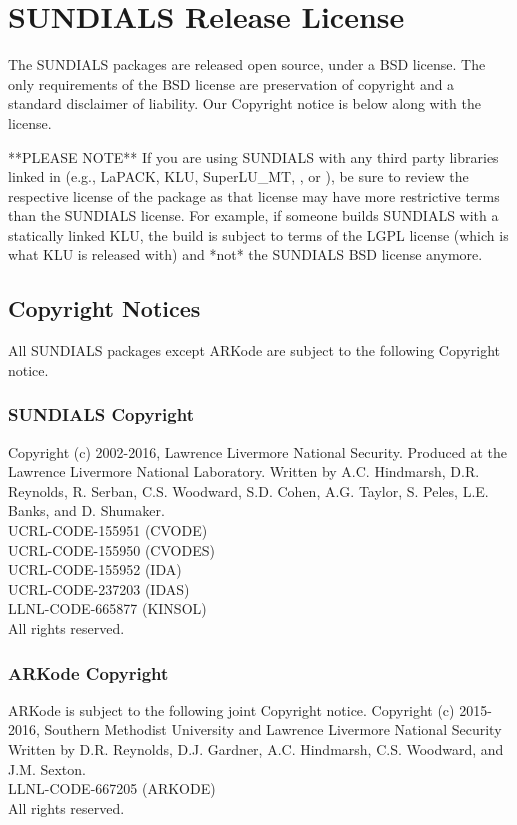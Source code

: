 \section{SUNDIALS Release License}

The SUNDIALS packages are released open source, under a BSD license.
The only requirements of the BSD license are preservation of copyright and a standard disclaimer of liability.
Our Copyright notice is below along with the license.

{\warn}**PLEASE NOTE**  If you are using SUNDIALS with any third 
party libraries linked in (e.g., LaPACK, KLU, SuperLU\_MT, {\petsc}, 
or {\hypre}), be sure to review the respective license of the package as 
that license may have more restrictive terms than the SUNDIALS license.  
For example, if someone builds SUNDIALS with a statically linked KLU, 
the build is subject to terms of the LGPL license (which is what 
KLU is released with) and *not* the SUNDIALS BSD license anymore.

\subsection{Copyright Notices}
All SUNDIALS packages except ARKode are subject to the following Copyright
notice.

\subsubsection{SUNDIALS Copyright}
Copyright (c) 2002-2016, Lawrence Livermore National Security. 
Produced at the Lawrence Livermore National Laboratory.
Written by A.C. Hindmarsh, D.R. Reynolds, R. Serban, C.S. Woodward,
S.D. Cohen, A.G. Taylor, S. Peles, L.E. Banks, and D. Shumaker. \\
UCRL-CODE-155951    (CVODE)\\
UCRL-CODE-155950    (CVODES)\\
UCRL-CODE-155952    (IDA)\\
UCRL-CODE-237203    (IDAS)\\
LLNL-CODE-665877    (KINSOL)\\
All rights reserved. 
 
\subsubsection{ARKode Copyright}
ARKode is subject to the following joint Copyright notice.
Copyright (c) 2015-2016, Southern Methodist University and 
Lawrence Livermore National Security
Written by D.R. Reynolds, D.J. Gardner, A.C. Hindmarsh, C.S. Woodward,
and J.M. Sexton.\\
LLNL-CODE-667205    (ARKODE) \\
All rights reserved.

